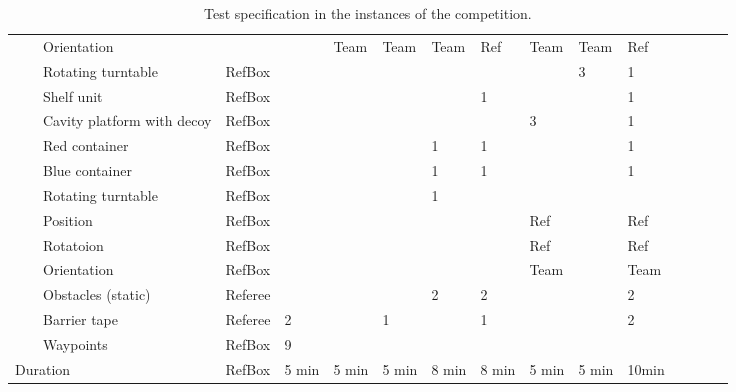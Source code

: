 \begin{landscape}
\begin{table}[h!]
\begin{tabular}{|l|l|l|l*{12}{|P{1cm}}|}
      &  & Orientation      &          &       &  Team &   Team  &  Team   &  Ref    &  Team  &Team & Ref   \\ \hhline{~~----------}
      &  & Rotating turntable& RefBox  &       &       &       &       &       &        & 3  & 1   \\ 
      \hhline{~-----------} 
      & 
         & Shelf unit          & RefBox &       &       &       &      &   1     &        &   & 1   \\ \hhline{~~----------}
      &  & Cavity platform with decoy& RefBox &       &       &       &       &       &  3   &   & 1   \\ \hhline{~~----------}
      &  & Red container       & RefBox &       &       &       &   1   &   1   &       &   & 1   \\ \hhline{~~----------}
      &  & Blue container      & RefBox &       &       &       &   1   &   1   &       &   & 1   \\ \hhline{~~----------}
      &  & Rotating turntable  & RefBox &       &       &       &   1   &      &       &   &    \\ 
      \hhline{------------} \hhline{------------}
      & 
         & Position     & RefBox &       &       &       &      &      &   Ref	  &   &  Ref   \\ \hhline{~~----------}
      &  & Rotatoion	& RefBox &       &       &       &      &      &   Ref    &   &  Ref   \\ \hhline{~~----------}
      &  & Orientation	& RefBox &       &       &       &      &      &   Team   &   &  Team  \\ 
    \hhline{~-----------} \hhline{~-----------}
     & 
     &     Obstacles (static) & Referee &       &       &       &   2   &   2   &       &   & 2   \\ \hhline{~~----------}
     &   & Barrier tape       & Referee &   2   &       &   1   &       &    1    &       &   & 2   \\ \hhline{~~----------}
     &   & Waypoints          & RefBox  &   9   &       &       &       &       &       &   &    \\ 
		\hline \hline
		 \multicolumn{3}{|l|}{Duration} 
		                    & RefBox & 5 min & 5 min & 5 min  &   8 min &   8 min & 5 min & 5 min & 10min \\
		\hline
 \end{tabular}
 \caption{Test specification in the instances of the \RCAW \YEAR competition.}
 \label{tab:Instances}
\end{table}
\end{landscape}


